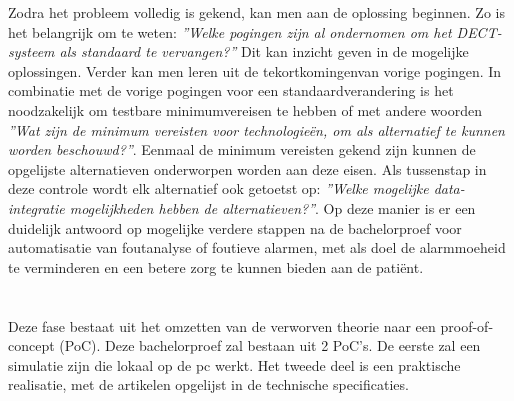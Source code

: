 Zodra het probleem volledig is gekend, kan men aan de oplossing beginnen. Zo is het belangrijk om te weten: \textit{''Welke pogingen zijn al ondernomen om het DECT-systeem als standaard te vervangen?''} Dit kan inzicht geven in de mogelijke oplossingen. Verder kan men leren uit de tekortkomingenvan vorige pogingen. In combinatie met de vorige pogingen voor een standaardverandering is het noodzakelijk om testbare minimumvereisen te hebben of met andere woorden \textit{''Wat zijn de minimum vereisten voor technologieën, om als alternatief te kunnen worden beschouwd?''}. 
Eenmaal de minimum vereisten gekend zijn kunnen de opgelijste alternatieven onderworpen worden aan deze eisen. Als tussenstap in deze controle wordt elk alternatief ook getoetst op: \textit{''Welke mogelijke data-integratie mogelijkheden hebben de alternatieven?''}. Op deze manier is er een duidelijk antwoord op mogelijke verdere stappen na de bachelorproef voor automatisatie van foutanalyse of foutieve alarmen, met als doel de alarmmoeheid te verminderen en een betere zorg te kunnen bieden aan de patiënt.



\section{}%
\label{sec:setup}%
Deze fase bestaat uit het omzetten van de verworven theorie naar een proof-of-concept (PoC). Deze bachelorproef zal bestaan uit 2 PoC's. De eerste zal een simulatie zijn die lokaal op de pc werkt. Het tweede deel is een praktische realisatie, met de artikelen opgelijst in de technische specificaties.

